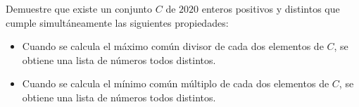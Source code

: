 Demuestre que existe un conjunto $C$ de $2020$ enteros positivos y distintos que cumple simultáneamente las siguientes propiedades:
 \begin{itemize} 
   \item Cuando se calcula el máximo común divisor de cada dos elementos de $C$, se obtiene una lista de números todos distintos.
   \item Cuando se calcula el mínimo común múltiplo de cada dos elementos de $C$, se obtiene una lista de números todos distintos.
 \end{itemize} 
